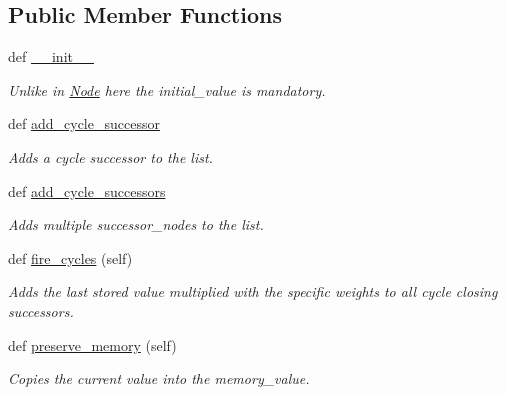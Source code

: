 \subsection*{Public Member Functions}
\begin{DoxyCompactItemize}
\item 
def \hyperlink{classNEAT__PyGenetics_1_1NEAT_1_1GenomeStructures_1_1SimulationStructure_1_1SimulationNodes_1_1CycleNode_a7296250c1afe722523e7897b0ab2b4d4}{\+\_\+\+\_\+init\+\_\+\+\_\+}
\begin{DoxyCompactList}\small\item\em Unlike in \hyperlink{classNEAT__PyGenetics_1_1NEAT_1_1GenomeStructures_1_1SimulationStructure_1_1SimulationNodes_1_1Node}{Node} here the initial\+\_\+value is mandatory. \end{DoxyCompactList}\item 
def \hyperlink{classNEAT__PyGenetics_1_1NEAT_1_1GenomeStructures_1_1SimulationStructure_1_1SimulationNodes_1_1CycleNode_acac910243feebfd38ee9bb9503a4db24}{add\+\_\+cycle\+\_\+successor}
\begin{DoxyCompactList}\small\item\em Adds a cycle successor to the list. \end{DoxyCompactList}\item 
def \hyperlink{classNEAT__PyGenetics_1_1NEAT_1_1GenomeStructures_1_1SimulationStructure_1_1SimulationNodes_1_1CycleNode_a842b0166427a3d54ba9dc87062d2cd57}{add\+\_\+cycle\+\_\+successors}
\begin{DoxyCompactList}\small\item\em Adds multiple successor\+\_\+nodes to the list. \end{DoxyCompactList}\item 
def \hyperlink{classNEAT__PyGenetics_1_1NEAT_1_1GenomeStructures_1_1SimulationStructure_1_1SimulationNodes_1_1CycleNode_aded4c01be2b30e8fc2d0bd89bd4d9763}{fire\+\_\+cycles} (self)
\begin{DoxyCompactList}\small\item\em Adds the last stored value multiplied with the specific weights to all cycle closing successors. \end{DoxyCompactList}\item 
def \hyperlink{classNEAT__PyGenetics_1_1NEAT_1_1GenomeStructures_1_1SimulationStructure_1_1SimulationNodes_1_1CycleNode_a55f0110c03f18c3b093f7cb06354e1e3}{preserve\+\_\+memory} (self)
\begin{DoxyCompactList}\small\item\em Copies the current value into the memory\+\_\+value. \end{DoxyCompactList}\end{DoxyCompactItemize}
